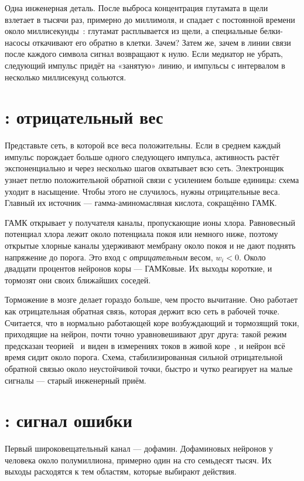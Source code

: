 Одна инженерная деталь. После выброса концентрация глутамата в щели взлетает в тысячи раз, примерно до миллимоля, и спадает с постоянной времени около миллисекунды~\cite{Clements1992}: глутамат расплывается из щели, а специальные белки-насосы откачивают его обратно в клетки. Зачем? Затем же, зачем в линии связи после каждого символа сигнал возвращают к нулю. Если медиатор не убрать, следующий импульс придёт на «занятую» линию, и импульсы с интервалом в несколько миллисекунд сольются.

\section{: отрицательный вес}

Представьте сеть, в которой все веса положительны. Если в среднем каждый импульс порождает больше одного следующего импульса, активность растёт экспоненциально и через несколько шагов охватывает всю сеть. Электронщик узнает петлю положительной обратной связи с усилением больше единицы: схема уходит в насыщение. Чтобы этого не случилось, нужны отрицательные веса. Главный их источник --- гамма-аминомасляная кислота, сокращённо ГАМК.

ГАМК открывает у получателя каналы, пропускающие ионы хлора. Равновесный потенциал хлора лежит около потенциала покоя или немного ниже, поэтому открытые хлорные каналы удерживают мембрану около покоя и не дают поднять напряжение до порога. Это вход с \emph{отрицательным} весом, $w_i<0$. Около двадцати процентов нейронов коры --- ГАМКовые. Их выходы короткие, и тормозят они своих ближайших соседей.

Торможение в мозге делает гораздо больше, чем просто вычитание. Оно работает как отрицательная обратная связь, которая держит всю сеть в рабочей точке. Считается, что в нормально работающей коре возбуждающий и тормозящий токи, приходящие на нейрон, почти точно уравновешивают друг друга: такой режим предсказан теорией~\cite{vanVreeswijk1996} и виден в измерениях токов в живой коре~\cite{Haider2006}, и нейрон всё время сидит около порога. Схема, стабилизированная сильной отрицательной обратной связью около неустойчивой точки, быстро и чутко реагирует на малые сигналы --- старый инженерный приём.

\section{: сигнал ошибки}

Первый широковещательный канал --- дофамин. Дофаминовых нейронов у человека около полумиллиона, примерно один на сто семьдесят тысяч. Их выходы расходятся к тем областям, которые выбирают действия.

